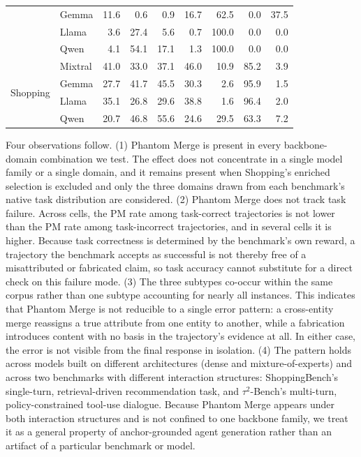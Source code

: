 \begin{table}[t]
{\begin{tabular}{llrrrrrrr}
 & Gemma   & 11.6 & 0.6  & 0.9  & 16.7 & 62.5  & 0.0  & 37.5  \\
 & Llama   & 3.6  & 27.4 & 5.6  & 0.7  & 100.0 & 0.0  & 0.0   \\
 & Qwen    & 4.1  & 54.1 & 17.1 & 1.3  & 100.0 & 0.0  & 0.0   \\
\midrule
\multirow{4}{*}{Shopping}
 & Mixtral & 41.0 & 33.0 & 37.1 & 46.0 & 10.9  & 85.2 & 3.9   \\
 & Gemma   & 27.7 & 41.7 & 45.5 & 30.3 & 2.6   & 95.9 & 1.5   \\
 & Llama   & 35.1 & 26.8 & 29.6 & 38.8 & 1.6   & 96.4 & 2.0   \\
 & Qwen    & 20.7 & 46.8 & 55.6 & 24.6 & 29.5  & 63.3 & 7.2   \\
\bottomrule
\end{tabular}}
\end{table}

Four observations follow. (1) Phantom Merge is present in every backbone-domain combination we test. The effect does not concentrate in a single model family or a single domain, and it remains present when Shopping's enriched selection is excluded and only the three domains drawn from each benchmark's native task distribution are considered. (2) Phantom Merge does not track task failure. Across cells, the PM rate among task-correct trajectories is not lower than the PM rate among task-incorrect trajectories, and in several cells it is higher. Because task correctness is determined by the benchmark's own reward, a trajectory the benchmark accepts as successful is not thereby free of a misattributed or fabricated claim, so task accuracy cannot substitute for a direct check on this failure mode. (3) The three subtypes co-occur within the same corpus rather than one subtype accounting for nearly all instances. This indicates that Phantom Merge is not reducible to a single error pattern: a cross-entity merge reassigns a true attribute from one entity to another, while a fabrication introduces content with no basis in the trajectory's evidence at all. In either case, the error is not visible from the final response in isolation. (4) The pattern holds across models built on different architectures (dense and mixture-of-experts) and across two benchmarks with different interaction structures: ShoppingBench's single-turn, retrieval-driven recommendation task, and $\tau^2$-Bench's multi-turn, policy-constrained tool-use dialogue. Because Phantom Merge appears under both interaction structures and is not confined to one backbone family, we treat it as a general property of anchor-grounded agent generation rather than an artifact of a particular benchmark or model.
